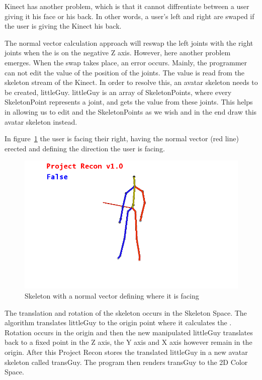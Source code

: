 Kinect has another problem, which is that it cannot diffrentiate between a user giving it his face or his back. In other words, a user's left and right are swaped if the user is giving the Kinect his back.


The normal vector calculation approach will reswap the left joints with the right joints when the \N is on the negative Z axis. 
However, here another problem emerges. When the swap takes place, an error occurs. Mainly, the programmer can not 
edit the value of the position of the joints. The value is read from the skeleton 
stream of the Kinect. In order to resolve this, an avatar skeleton needs to be 
created, littleGuy. littleGuy is an array of SkeletonPoints, where every 
SkeletonPoint represents a joint, and gets the value from these joints. This 
helps in allowing us to edit and the SkeletonPoints as we wish and in the end 
draw this avatar skeleton instead.

In figure~\ref{skeletonnormal} the user is facing their right, having the normal vector (red 
line) erected and defining the direction the user is facing.

\begin{figure}[!htbp]
\centering
\includegraphics[width=1\textwidth]{images/skeleton_normal.png}
\caption{Skeleton with a normal vector defining where it is facing}
\label{skeletonnormal}
\end{figure}

The translation and rotation of the skeleton occurs in the Skeleton Space. The algorithm translates littleGuy to the origin point where it calculates the \N. Rotation occurs in the origin and then the new manipulated littleGuy translates back to a fixed point in the Z axis, the Y axis and X axis however remain in the origin. After this Project Recon stores the translated littleGuy in a new avatar skeleton called transGuy. The program then renders transGuy to the 2D Color Space. 

